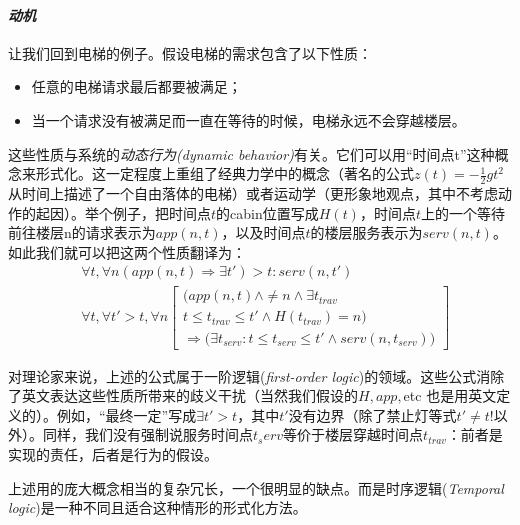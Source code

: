 \documentclass{book}
\begin{document}
    \paragraph{{\itshape 动机}} 让我们回到电梯的例子。假设电梯的需求包含了以下性质：
    \begin{itemize}
      \item 任意的电梯请求最后都要被满足；
      \item 当一个请求没有被满足而一直在等待的时候，电梯永远不会穿越楼层。
    \end{itemize}

    这些性质与系统的{\itshape 动态行为(dynamic behavior)}有关。它们可以用“时间点t”这种概念来形式化。这一定程度上重组了经典力学中的概念（著名的公式$z(t)=-\frac{1}{2}gt^2$从时间上描述了一个自由落体的电梯）或者运动学（更形象地观点，其中不考虑动作的起因）。举个例子，把时间点$t$的cabin位置写成$H(t)$，时间点$t$上的一个等待前往楼层n的请求表示为$app(n,t)$，以及时间点$t$的楼层服务表示为$serv(n,t)$。如此我们就可以把这两个性质翻译为：
    \begin{equation*}
      \begin{aligned}
      & \forall{t},\forall{n}(app(n,t) \Rightarrow \exists{t'})>t:serv(n,t') \\
      & \forall{t},\forall{t'}>t,\forall{n}\begin{bmatrix}
                                             \bigg( app(n,t) \wedge \neq n \wedge \exists{t_{trav}} \\
                                             t \leq t_{trav} \leq t' \wedge H(t_{trav})=n\bigg) \\
                                             \Rightarrow \bigg(\exists{t_{serv}}:t \leq t_{serv} \leq t' \wedge serv(n,t_{serv})\bigg)
                                           \end{bmatrix}
      \end{aligned}
    \end{equation*}

    对理论家来说，上述的公式属于一阶逻辑({\itshape first-order logic})的领域。这些公式消除了英文表达这些性质所带来的歧义干扰（当然我们假设的$H, app,$etc 也是用英文定义的）。例如，“最终一定”写成$\exists{t'}>t$，其中$t'$没有边界（除了禁止灯等式$t' \neq t!$以外）。同样，我们没有强制说服务时间点$t_serv$等价于楼层穿越时间点$t_{trav}$：前者是实现的责任，后者是行为的假设。

    上述用的庞大概念相当的复杂冗长，一个很明显的缺点。而是时序逻辑({\itshape Temporal logic})是一种不同且适合这种情形的形式化方法。
\end{document}
